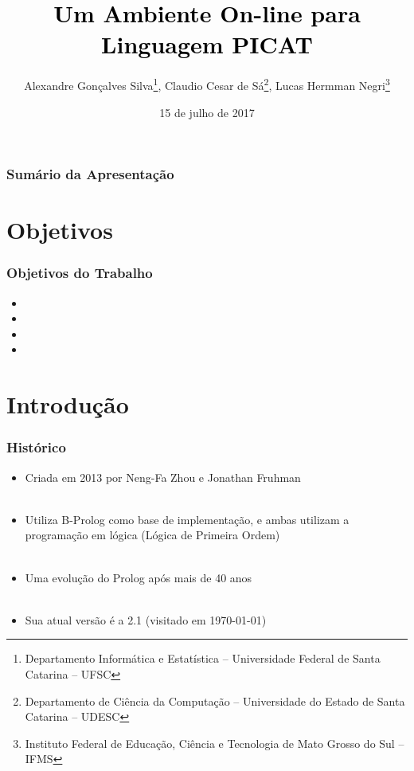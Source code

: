 \documentclass[brazil]{beamer}
\title[Picat]{\fontsize{20}{30}\selectfont \textcolor{black}{Um Ambiente On-line para Linguagem PICAT}}
\author{Alexandre Gonçalves Silva\footnote{Departamento Informática e Estatística -- Universidade Federal de Santa Catarina -- UFSC}, Claudio Cesar de Sá\footnote{Departamento de Ciência da Computação -- Universidade do Estado de Santa Catarina -- UDESC}, Lucas Hermman Negri\footnote{Instituto Federal de Educação, Ciência e Tecnologia de Mato Grosso do Sul -- IFMS}}
\institute{}
\date{15 de julho de 2017}
\begin{document}
\begin{frame}
    \titlepage
\end{frame}



\begin{frame}[fragile]
\frametitle{Sumário da Apresentação}
\tableofcontents
\end{frame}



\section{Objetivos}


\begin{frame}

    \frametitle{Objetivos do Trabalho}

    \begin{itemize}
      \item 
      \item 
      \item 
      \item 
    \end{itemize}
\end{frame}


\section{Introdução}
\begin{frame}

    \frametitle{Histórico}

    \begin{itemize}
      \item Criada em 2013 por Neng-Fa Zhou e Jonathan Fruhman \\~\\

      \item Utiliza B-Prolog como base de implementação, e ambas utilizam 
      a programação em lógica (Lógica de Primeira Ordem) \\~\\

      \item Uma evolução do Prolog após mais de 40 anos \\~\\

      \item Sua atual versão é a 2.1 (visitado em \today)

    \end{itemize}
\end{frame}
\end{document}
